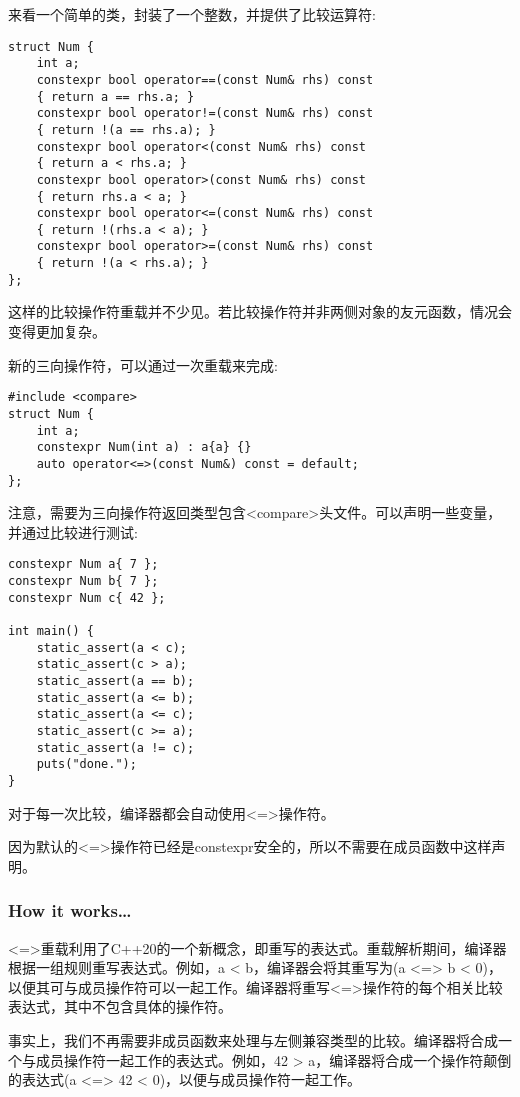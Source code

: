 来看一个简单的类，封装了一个整数，并提供了比较运算符:

\begin{lstlisting}[style=styleCXX]
struct Num {
	int a;
	constexpr bool operator==(const Num& rhs) const
	{ return a == rhs.a; }
	constexpr bool operator!=(const Num& rhs) const
	{ return !(a == rhs.a); }
	constexpr bool operator<(const Num& rhs) const
	{ return a < rhs.a; }
	constexpr bool operator>(const Num& rhs) const
	{ return rhs.a < a; }
	constexpr bool operator<=(const Num& rhs) const
	{ return !(rhs.a < a); }
	constexpr bool operator>=(const Num& rhs) const
	{ return !(a < rhs.a); }
};
\end{lstlisting}

这样的比较操作符重载并不少见。若比较操作符并非两侧对象的友元函数，情况会变得更加复杂。

新的三向操作符，可以通过一次重载来完成:

\begin{lstlisting}[style=styleCXX]
#include <compare>
struct Num {
	int a;
	constexpr Num(int a) : a{a} {}
	auto operator<=>(const Num&) const = default;
};
\end{lstlisting}

注意，需要为三向操作符返回类型包含<compare>头文件。可以声明一些变量，并通过比较进行测试:

\begin{lstlisting}[style=styleCXX]
constexpr Num a{ 7 };
constexpr Num b{ 7 };
constexpr Num c{ 42 };

int main() {
	static_assert(a < c);
	static_assert(c > a);
	static_assert(a == b);
	static_assert(a <= b);
	static_assert(a <= c);
	static_assert(c >= a);
	static_assert(a != c);
	puts("done.");
}
\end{lstlisting}

对于每一次比较，编译器都会自动使用<=>操作符。

因为默认的<=>操作符已经是constexpr安全的，所以不需要在成员函数中这样声明。

\subsubsection{How it works…}

<=>重载利用了C++20的一个新概念，即重写的表达式。重载解析期间，编译器根据一组规则重写表达式。例如，a < b，编译器会将其重写为(a <=> b < 0)，以便其可与成员操作符可以一起工作。编译器将重写<=>操作符的每个相关比较表达式，其中不包含具体的操作符。

事实上，我们不再需要非成员函数来处理与左侧兼容类型的比较。编译器将合成一个与成员操作符一起工作的表达式。例如，42 > a，编译器将合成一个操作符颠倒的表达式(a <=> 42 < 0)，以便与成员操作符一起工作。

